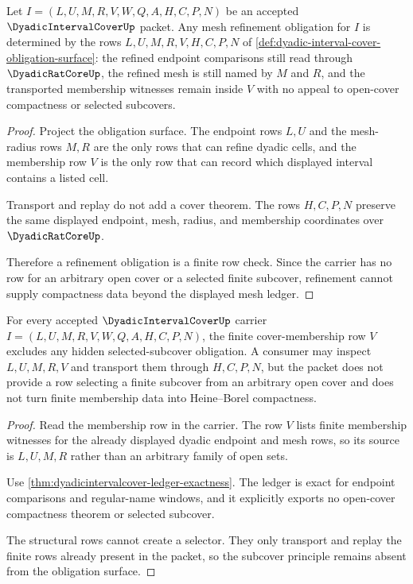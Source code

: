 \begin{theorem}
\label{thm:dyadic-interval-cover-mesh-refinement-obligation}
Let $I=(L,U,M,R,V,W,Q,A,H,C,P,N)$ be an accepted $\DyadicIntervalCoverUp$ packet. Any mesh refinement obligation for $I$ is determined by the rows $L,U,M,R,V,H,C,P,N$ of \autoref{def:dyadic-interval-cover-obligation-surface}: the refined endpoint comparisons still read through $\DyadicRatCoreUp$, the refined mesh is still named by $M$ and $R$, and the transported membership witnesses remain inside $V$ with no appeal to open-cover compactness or selected subcovers.
\end{theorem}
\begin{proof}
Project the obligation surface. The endpoint rows $L,U$ and the mesh-radius rows $M,R$ are the only rows that can refine dyadic cells, and the membership row $V$ is the only row that can record which displayed interval contains a listed cell.

Transport and replay do not add a cover theorem. The rows $H,C,P,N$ preserve the same displayed endpoint, mesh, radius, and membership coordinates over $\DyadicRatCoreUp$.

Therefore a refinement obligation is a finite row check. Since the carrier has no row for an arbitrary open cover or a selected finite subcover, refinement cannot supply compactness data beyond the displayed mesh ledger.
\end{proof}

\begin{theorem}
\label{thm:dyadic-interval-cover-subcover-exclusion-obligation}
For every accepted $\DyadicIntervalCoverUp$ carrier $I=(L,U,M,R,V,W,Q,A,H,C,P,N)$, the finite cover-membership row $V$ excludes any hidden selected-subcover obligation. A consumer may inspect $L,U,M,R,V$ and transport them through $H,C,P,N$, but the packet does not provide a row selecting a finite subcover from an arbitrary open cover and does not turn finite membership data into Heine--Borel compactness.
\end{theorem}
\begin{proof}
Read the membership row in the carrier. The row $V$ lists finite membership witnesses for the already displayed dyadic endpoint and mesh rows, so its source is $L,U,M,R$ rather than an arbitrary family of open sets.

Use \autoref{thm:dyadicintervalcover-ledger-exactness}. The ledger is exact for endpoint comparisons and regular-name windows, and it explicitly exports no open-cover compactness theorem or selected subcover.

The structural rows cannot create a selector. They only transport and replay the finite rows already present in the packet, so the subcover principle remains absent from the obligation surface.
\end{proof}

